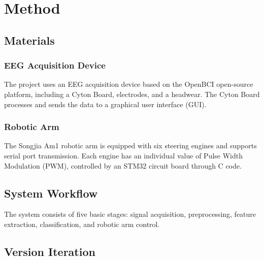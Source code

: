 \documentclass[12pt]{report}
\begin{document}
\chapter{Method}
\section{Materials}
\subsection{EEG Acquisition Device}
The project uses an EEG acquisition device based on the OpenBCI open-source platform, including a Cyton Board, electrodes, and a headwear. The Cyton Board processes and sends the data to a graphical user interface (GUI).


\subsection{Robotic Arm}
The Songjia Am1 robotic arm is equipped with six steering engines and supports serial port transmission. Each engine has an individual value of Pulse Width Modulation (PWM), controlled by an STM32 circuit board through C code.


\section{System Workflow}
The system consists of five basic stages: signal acquisition, preprocessing, feature extraction, classification, and robotic arm control. 


\section{Version Iteration}
\end{document}
